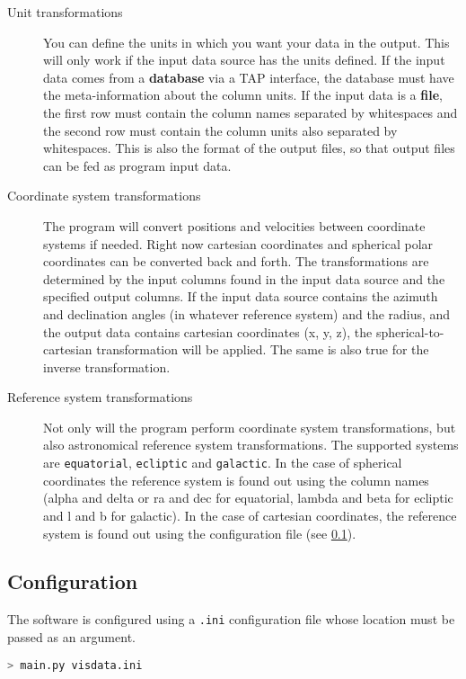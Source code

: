 \documentclass[
a4paper, %
11pt, %
onecolumn, %
openany, %
]{memoir}
\begin{document}
\begin{description}
\item[Unit transformations] You can define the units in which you want your data in the output. This will only
work if the input data source has the units defined. If the input data comes from a \textbf{database} via a TAP interface,
the database must have the meta-information about the column units. If the input data is a \textbf{file}, the first row must 
contain the column names separated by whitespaces and the second row must contain the column units also separated by whitespaces.
This is also the format of the output files, so that output files can be fed as program input data.
\item[Coordinate system transformations] The program will convert positions and velocities between coordinate systems if 
needed. Right now cartesian coordinates and spherical polar coordinates can be converted back and forth. The transformations
are determined by the input columns found in the input data source and the specified output columns. If the input data source contains
the azimuth and declination angles (in whatever reference system) and the radius, and the output data contains cartesian
coordinates (x, y, z), the spherical-to-cartesian transformation will be applied. The same is also true for the inverse
transformation.
\item[Reference system transformations] Not only will the program perform coordinate system transformations, but also astronomical reference
system transformations. The supported systems are \texttt{equatorial}, \texttt{ecliptic} and \texttt{galactic}. In the case of spherical
coordinates the reference system is found out using the column names (alpha and delta or ra and dec for equatorial, lambda and beta for ecliptic and l and
b for galactic). In the case of cartesian coordinates, the reference system is found out using the configuration file (see \ref{configuration}).
\end{description}

\subsection{Configuration}\label{configuration}
The software is configured using a \texttt{.ini} configuration file whose location must be passed as an
argument.

\begin{lstlisting}[language=Python]
> main.py visdata.ini
\end{lstlisting}
\end{document}

